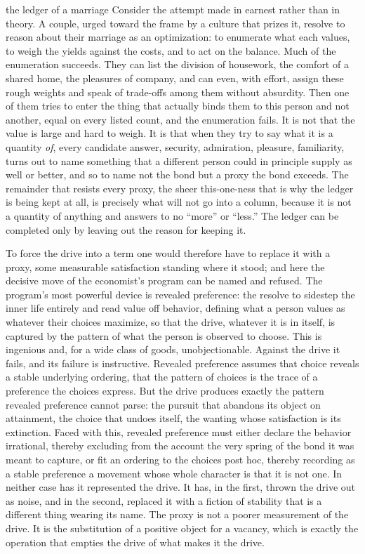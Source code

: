 \begin{casebox}{the ledger of a marriage}
Consider the attempt made in earnest rather than in theory. A couple, urged toward the frame by a culture that prizes it, resolve to reason about their marriage as an optimization: to enumerate what each values, to weigh the yields against the costs, and to act on the balance. Much of the enumeration succeeds. They can list the division of housework, the comfort of a shared home, the pleasures of company, and can even, with effort, assign these rough weights and speak of trade-offs among them without absurdity. Then one of them tries to enter the thing that actually binds them to this person and not another, equal on every listed count, and the enumeration fails. It is not that the value is large and hard to weigh. It is that when they try to say what it is a quantity \emph{of}, every candidate answer, security, admiration, pleasure, familiarity, turns out to name something that a different person could in principle supply as well or better, and so to name not the bond but a proxy the bond exceeds. The remainder that resists every proxy, the sheer this-one-ness that is why the ledger is being kept at all, is precisely what will not go into a column, because it is not a quantity of anything and answers to no ``more'' or ``less.'' The ledger can be completed only by leaving out the reason for keeping it.
\end{casebox}

To force the drive into a term one would therefore have to replace it with a proxy, some measurable satisfaction standing where it stood; and here the decisive move of the economist's program can be named and refused. The program's most powerful device is revealed preference: the resolve to sidestep the inner life entirely and read value off behavior, defining what a person values as whatever their choices maximize, so that the drive, whatever it is in itself, is captured by the pattern of what the person is observed to choose. This is ingenious and, for a wide class of goods, unobjectionable. Against the drive it fails, and its failure is instructive. Revealed preference assumes that choice reveals a stable underlying ordering, that the pattern of choices is the trace of a preference the choices express. But the drive produces exactly the pattern revealed preference cannot parse: the pursuit that abandons its object on attainment, the choice that undoes itself, the wanting whose satisfaction is its extinction. Faced with this, revealed preference must either declare the behavior irrational, thereby excluding from the account the very spring of the bond it was meant to capture, or fit an ordering to the choices post hoc, thereby recording as a stable preference a movement whose whole character is that it is not one. In neither case has it represented the drive. It has, in the first, thrown the drive out as noise, and in the second, replaced it with a fiction of stability that is a different thing wearing its name. The proxy is not a poorer measurement of the drive. It is the substitution of a positive object for a vacancy, which is exactly the operation that empties the drive of what makes it the drive.

